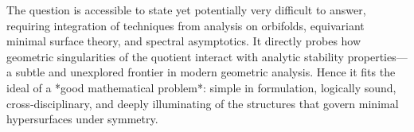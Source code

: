 The question is accessible to state yet potentially very difficult to answer, requiring integration of techniques from analysis on orbifolds, equivariant minimal surface theory, and spectral asymptotics.  
It directly probes how geometric singularities of the quotient interact with analytic stability properties—a subtle and unexplored frontier in modern geometric analysis.  
Hence it fits the ideal of a *good mathematical problem*: simple in formulation, logically sound, cross‑disciplinary, and deeply illuminating of the structures that govern minimal hypersurfaces under symmetry.